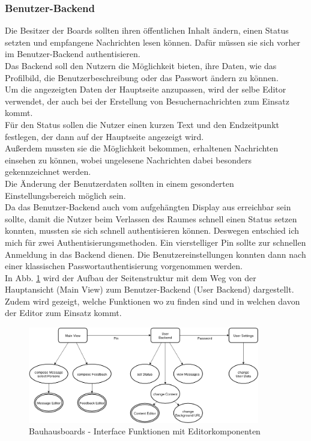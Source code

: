 \subsubsection{Benutzer-Backend}\label{Benutzer-Backend}
Die Besitzer der Boards sollten ihren öffentlichen Inhalt ändern, einen Status setzten und empfangene Nachrichten lesen können.
Dafür müssen sie sich vorher im Benutzer-Backend authentisieren.
\\
Das Backend soll den Nutzern die Möglichkeit bieten, ihre Daten, wie das Profilbild, die Benutzerbeschreibung oder das Passwort ändern zu können.
\\
Um die angezeigten Daten der Hauptseite anzupassen, wird der selbe Editor verwendet, der auch bei der Erstellung von Besuchernachrichten zum Einsatz kommt.
\\
Für den Status sollen die Nutzer einen kurzen Text und den Endzeitpunkt festlegen, der dann auf der Hauptseite angezeigt wird.
\\
Außerdem mussten sie die Möglichkeit bekommen, erhaltenen Nachrichten einsehen zu können, wobei ungelesene Nachrichten dabei besonders gekennzeichnet werden.\\
Die Änderung der Benutzerdaten sollten in einem gesonderten Einstellungsbereich möglich sein.
\\
Da das Benutzer-Backend auch vom aufgehängten Display aus erreichbar sein sollte, damit die Nutzer beim Verlassen des Raumes schnell einen Status setzen konnten, mussten sie sich schnell authentisieren können.
Deswegen entschied ich mich für zwei Authentisierungsmethoden.
Ein vierstelliger Pin sollte zur schnellen Anmeldung in das Backend dienen.
Die Benutzereinstellungen konnten dann nach einer klassischen Passwortauthentisierung vorgenommen werden.
\\
In Abb. \ref{img:Interface} wird der Aufbau der Seitenstruktur mit dem Weg von der Hauptansicht (Main View) zum Benutzer-Backend (User Backend) dargestellt.
Zudem wird gezeigt, welche Funktionen wo zu finden sind und in welchen davon der Editor zum Einsatz kommt.
\begin{figure}[h!]
  \centering
    \includegraphics[width=0.9\textwidth]{./img/LocationsFrontend.png}
  \caption{Bauhausboards - Interface Funktionen mit Editorkomponenten}
  \label{img:Interface}
\end{figure}

